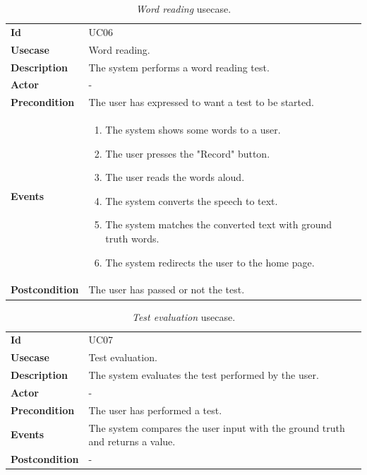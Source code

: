 \begin{table}[h!t]
    \centering
    \caption{\emph{Word reading} usecase.}
    \label{tab:uc:word}
    \centering
    \begin{tabular}{l | p{80mm}}
        \textbf{Id}            & UC06                                                 \\
        \textbf{Usecase}       & Word reading.                                        \\
        \textbf{Description}   & The system performs a word reading test.             \\
        \textbf{Actor}         & -                                                    \\
        \textbf{Precondition}  & The user has expressed to want a test to be started. \\
        \textbf{Events}        & \begin{enumerate}
            \item The system shows some words to a user.
            \item The user presses the "Record" button.
            \item The user reads the words aloud.
            \item The system converts the speech to text.
            \item The system matches the converted text with ground truth words.
            \item The system redirects the user to the home page.
        \end{enumerate}                            \\
        \textbf{Postcondition} & The user has passed or not the test.
    \end{tabular}
\end{table}

\begin{table}[h!t]
    \centering
    \caption{\emph{Test evaluation} usecase.}
    \label{tab:uc:evaluation}
    \centering
    \begin{tabular}{l | p{80mm}}
        \textbf{Id}            & UC07                                                                          \\
        \textbf{Usecase}       & Test evaluation.                                                              \\
        \textbf{Description}   & The system evaluates the test performed by the user.                          \\
        \textbf{Actor}         & -                                                                             \\
        \textbf{Precondition}  & The user has performed a test.                                                \\
        \textbf{Events}        & The system compares the user input with the ground truth and returns a value. \\
        \textbf{Postcondition} & -
    \end{tabular}
\end{table}

